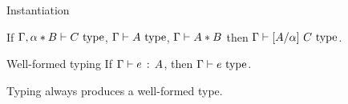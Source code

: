 \begin{lemma}{Instantiation} \label{instantiation}

  If $\Gamma, \alpha * B \vdash C \ \text{type}$, $\Gamma \vdash A \ \text{type}$, $\Gamma \vdash A * B$ then $\Gamma \vdash \lbrack A / \alpha \rbrack~ C \ \text{type}$.

\end{lemma}

%
%
%
%
%
%
%

\begin{lemma}{Well-formed typing} \label{wf-typing}
If $\Gamma \vdash e \ \!:\! \ A$, then $\Gamma \vdash e \ \text{type}$.
\end{lemma}
Typing always produces a well-formed type.

